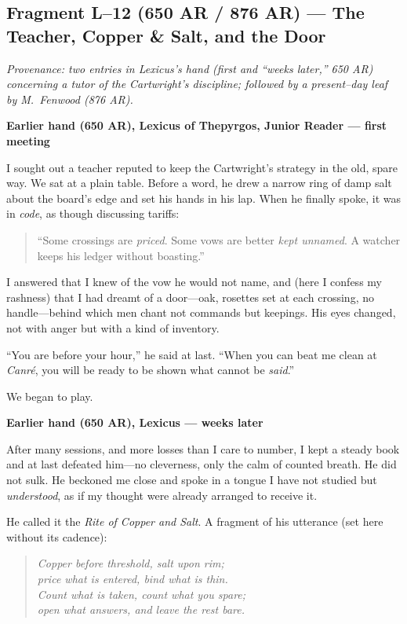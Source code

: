 \documentclass[11pt]{article}
\numberwithin{equation}{section} %
\theoremstyle{plain} %
\theoremstyle{definition} %
\theoremstyle{remark} %
\begin{document}
\subsection{Fragment L--12 (650 AR / 876 AR) — The Teacher, Copper \& Salt, and the Door}
\label{frag:l12}

\noindent\textit{Provenance: two entries in Lexicus’s hand (first and “weeks later,” 650 AR) concerning a tutor of the Cartwright’s discipline; followed by a present–day leaf by M.\ Fenwood (876 AR).}

\medskip
\noindent\textbf{Earlier hand (650 AR), Lexicus of Thepyrgos, Junior Reader — first meeting}

I sought out a teacher reputed to keep the Cartwright’s strategy in the old, spare way. We sat at a plain table. Before a word, he drew a narrow ring of damp salt about the board’s edge and set his hands in his lap. When he finally spoke, it was in \emph{code}, as though discussing tariffs:

\begin{quote}\small
“Some crossings are \emph{priced}. Some vows are better \emph{kept unnamed}. A watcher keeps his ledger without boasting.”
\end{quote}

I answered that I knew of the vow he would not name, and (here I confess my rashness) that I had dreamt of a door—oak, rosettes set at each crossing, no handle—behind which men chant not commands but keepings. His eyes changed, not with anger but with a kind of inventory.

“You are before your hour,” he said at last. “When you can beat me clean at \textit{Canr\'e}, you will be ready to be shown what cannot be \emph{said}.”

We began to play.

\medskip
\noindent\textbf{Earlier hand (650 AR), Lexicus — weeks later}

After many sessions, and more losses than I care to number, I kept a steady book and at last defeated him—no cleverness, only the calm of counted breath. He did not sulk. He beckoned me close and spoke in a tongue I have not studied but \emph{understood}, as if my thought were already arranged to receive it.

He called it the \textit{Rite of Copper and Salt}. A fragment of his utterance (set here without its cadence):

\begin{quote}\small
\textit{Copper before threshold, salt upon rim;\\
price what is entered, bind what is thin.\\
Count what is taken, count what you spare;\\
open what answers, and leave the rest bare.}
\end{quote}
\end{document}
